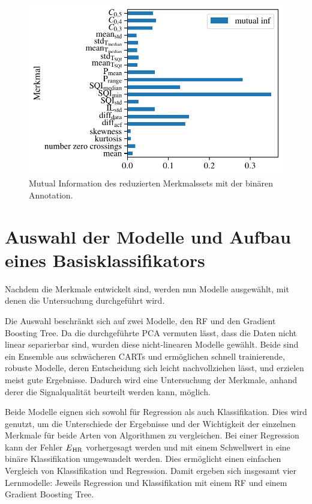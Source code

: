 \begin{figure}[H]
	\centering
	\includegraphics[scale=0.85]{pic/mutual-inf-own-reduced.pdf}
	\caption{Mutual Information des reduzierten Merkmalssets mit der binären Annotation.}
	\label{fig:mutual-inf-own}
\end{figure}

\section{Auswahl der Modelle und Aufbau eines Basisklassifikators}

Nachdem die Merkmale entwickelt sind, werden nun Modelle ausgewählt, mit denen die Untersuchung durchgeführt wird.

Die Auswahl beschränkt sich auf zwei Modelle, den \acl{RF} und den Gradient Boosting Tree. Da die durchgeführte \ac{PCA} vermuten lässt, dass die Daten nicht linear separierbar sind, wurden diese nicht-linearen Modelle gewählt. Beide sind ein Ensemble aus schwächeren \ac{CART}s und ermöglichen schnell trainierende, robuste Modelle, deren Entscheidung sich leicht nachvollziehen lässt, und erzielen meist gute Ergebnisse. Dadurch wird eine Untersuchung der Merkmale, anhand derer die Signalqualität beurteilt werden kann, möglich.

Beide Modelle eignen sich sowohl für Regression als auch Klassifikation. Dies wird genutzt, um die Unterschiede der Ergebnisse und der Wichtigkeit der einzelnen Merkmale für beide Arten von Algorithmen zu vergleichen. Bei einer Regression kann der Fehler $E\textsubscript{HR}$ vorhergesagt werden und mit einem Schwellwert in eine binäre Klassifikation umgewandelt werden. Dies ermöglicht einen einfachen Vergleich von Klassifikation und Regression. Damit ergeben sich insgesamt vier Lernmodelle: Jeweils Regression und Klassifikation mit einem \ac{RF} und einem Gradient Boosting Tree.

